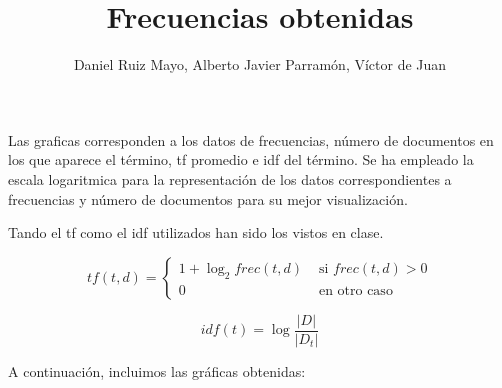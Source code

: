 \documentclass[palatino,nochap]{apuntes}
\title{Frecuencias obtenidas}
\author{Daniel Ruiz Mayo, Alberto Javier Parramón, Víctor de Juan}
\date{}
\begin{document}
\pagestyle{plain}
\maketitle

Las graficas corresponden a los datos de frecuencias, número de documentos en los que aparece el término, tf promedio e idf del término.
Se ha empleado la escala logaritmica para la representación de los datos correspondientes a frecuencias y número de documentos para su mejor visualización.

Tando el tf como el idf utilizados han sido los vistos en clase.

\[ tf(t,d) = \left\{ \begin{array}{cc} 1+\log_2frec(t,d) & \text{ si } frec(t,d) > 0\\ 0 & \text{ en otro caso}\end{array}\right. \]

\[ idf(t) = \log \frac{|D|}{|D_t|} \]

A continuación, incluimos las gráficas obtenidas:



\appendix
\end{document}
